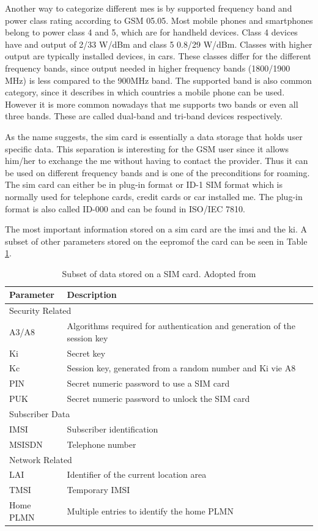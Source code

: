 Another way to categorize different \gls{me}s is by supported frequency band and power class rating according to GSM  05.05\cite{GSM0505}.
Most mobile phones and smartphones belong to power class 4 and 5, which are for handheld devices.
Class 4 devices have and output of 2/33 W/dBm and class 5 0.8/29 W/dBm.
Classes with higher output are typically installed devices, \eg in cars.
These classes differ for the different frequency bands, since output needed in higher frequency bands (1800/1900 MHz) is less compared to the 900MHz band.
The supported band is also common category, since it describes in which countries a mobile phone can be used.
However it is more common nowadays that \gls{me} supports two bands or even all three bands.
These are called dual-band and tri-band devices respectively.

As the name suggests, the \gls{sim} card is essentially a data storage that holds user specific data.
This separation is interesting for the GSM user since it allows him/her to exchange the \gls{me} without having to contact the provider.
Thus it can be used on different frequency bands and is one of the preconditions for roaming.
The \gls{sim} card can either be in plug-in format or ID-1 SIM format which is normally used for telephone cards, credit cards or car installed \gls{me}.
The plug-in format is also called ID-000 and can be found in ISO/IEC 7810\cite{ISO7810}.

The most important information stored on a \gls{sim} card are the \gls{imsi} and the \gls{ki}.
A subset of other parameters stored on the \gls{eeprom}of the card can be seen in Table \ref{tab:simdata}.

\begin{table}
\centering
\begin{tabular}{@{}l>{\raggedright\arraybackslash}p{}@{}}
\toprule
Parameter		&Description\\
\midrule
\multicolumn{2}{l}{Security Related}\\
\midrule
A3/A8			&Algorithms required for authentication and generation of the session key\\
Ki				&Secret key\\
Kc				&Session key, generated from a random number and Ki vie A8\\
PIN				&Secret numeric password to use a SIM card\\
PUK				&Secret numeric password to unlock the SIM card\\
\midrule
\multicolumn{2}{l}{Subscriber Data}\\
\midrule
IMSI			&Subscriber identification\\
MSISDN			&Telephone number\\
\midrule
\multicolumn{2}{l}{Network Related}\\
\midrule
LAI				&Identifier of the current location area\\
TMSI			&Temporary IMSI\\
Home PLMN		&Multiple entries to identify the home PLMN\\
\bottomrule
\end{tabular}
\caption{Subset of data stored on a SIM card. Adopted from \cite{protocols1999}}
\label{tab:simdata}
\end{table}

